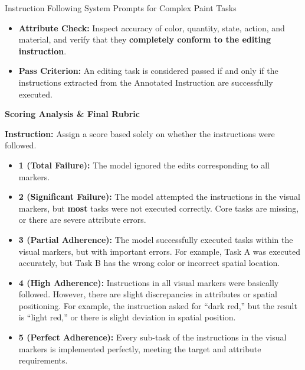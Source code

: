 \begin{promptbox}[label={System Prompts: IF_Complex Paint}]{Instruction Following System Prompts for Complex Paint Tasks}
\begin{itemize}[leftmargin=2.2em, labelsep=0.4em, itemsep=2pt]
    \item \textbf{Attribute Check:} Inspect accuracy of color, quantity, state, action, and material, and verify that they \textbf{completely conform to the editing instruction}.
    
    \item \textbf{Pass Criterion:} An editing task is considered passed if and only if the instructions extracted from the Annotated Instruction are successfully executed.
\end{itemize}

\medskip

\textbf{Scoring Analysis \& Final Rubric}

\textbf{Instruction:} Assign a score based solely on whether the instructions were followed.

\begin{itemize}[leftmargin=2.2em, labelsep=0.4em, itemsep=2pt]
    \item \textbf{1 (Total Failure):} The model ignored the edits corresponding to all markers.
    
    \item \textbf{2 (Significant Failure):} The model attempted the instructions in the visual markers, but \textbf{most} tasks were not executed correctly. Core tasks are missing, or there are severe attribute errors.
    
    \item \textbf{3 (Partial Adherence):} The model successfully executed tasks within the visual markers, but with important errors. For example, Task A was executed accurately, but Task B has the wrong color or incorrect spatial location.
    
    \item \textbf{4 (High Adherence):} Instructions in all visual markers were basically followed. However, there are slight discrepancies in attributes or spatial positioning. For example, the instruction asked for ``dark red,'' but the result is ``light red,'' or there is slight deviation in spatial position.
    
    \item \textbf{5 (Perfect Adherence):} Every sub-task of the instructions in the visual markers is implemented perfectly, meeting the target and attribute requirements.
\end{itemize}

\end{promptbox}


\clearpage


